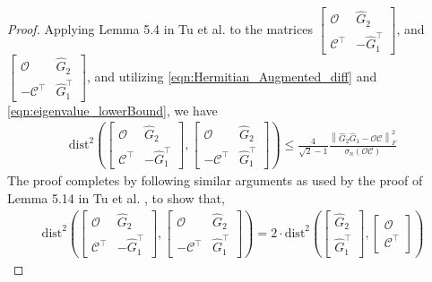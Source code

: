 \documentclass[11pt]{article}
\renewcommand{\cite}{\citep}
\newcommand{\Ccal}{\mathcal{C}}
\newcommand{\Ocal}{\mathcal{O}}
\newcommand{\distsqr}[1]{\text{dist}^2\left(#1\right)}
\newcommand{\T}{\top}
\newcommand{\fronorm}[1]{\left\|#1\right\|_{F}}
\newcommand{\<}{\langle}
\renewcommand{\>}{\rangle}
\numberwithin{equation}{section}
\begin{document}
\begin{proof}
	Applying Lemma 5.4 in Tu et al. \cite{tu2016low} to the matrices $\begin{bmatrix}
		\Ocal & \hat{G}_2 \\
		\Ccal^\T &  -\hat{G}_1^{\T}
	\end{bmatrix}$, and $\begin{bmatrix}
		\Ocal & \hat{G}_2 \\
		-\Ccal^\T &  \hat{G}_1^{\T}
	\end{bmatrix}$, and utilizing \eqref{eqn:Hermitian_Augmented_diff} and \eqref{eqn:eigenvalue_lowerBound}, we have
	\begin{align}
		\distsqr{ \begin{bmatrix}
				\Ocal & \hat{G}_2 \\
				\Ccal^\T &  -\hat{G}_1^{\T}
			\end{bmatrix},
			\begin{bmatrix}
				\Ocal & \hat{G}_2 \\
				-\Ccal^\T &  \hat{G}_1^{\T}
		\end{bmatrix}} \leq
		\frac{4}{\sqrt{2} - 1} \frac{\fronorm{\hat{G}_2 \hat{G}_1 - \Ocal \Ccal}^2}{\sigma_{n}\left(\Ocal \Ccal\right)}
	\end{align}
	The proof completes by following similar arguments as used by the proof of Lemma 5.14 in Tu et al. \cite{tu2016low}, to show that,
	\begin{align}
		\distsqr{ \begin{bmatrix}
				\Ocal & \hat{G}_2 \\
				\Ccal^\T &  -\hat{G}_1^{\T}
			\end{bmatrix},
			\begin{bmatrix}
				\Ocal & \hat{G}_2 \\
				-\Ccal^\T &  \hat{G}_1^{\T}
		\end{bmatrix}} = 2 \cdot \distsqr{\begin{bmatrix}\hat{G}_2 \\ \hat{G}_1^\T \end{bmatrix},\begin{bmatrix}\Ocal \\ \Ccal^\T\end{bmatrix}}
	\end{align}
\end{proof}
\end{document}
